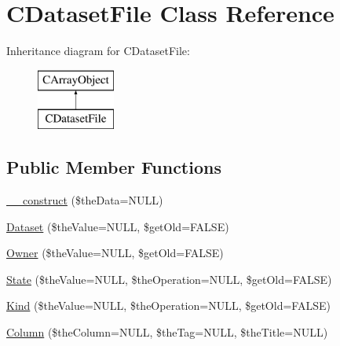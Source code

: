 \hypertarget{class_c_dataset_file}{\section{C\-Dataset\-File Class Reference}
\label{class_c_dataset_file}
}
Inheritance diagram for C\-Dataset\-File\-:\begin{figure}[H]
\begin{center}
\leavevmode
\includegraphics[height=2.000000cm]{class_c_dataset_file}
\end{center}
\end{figure}
\subsection*{Public Member Functions}
\begin{DoxyCompactItemize}
\item 
\hyperlink{class_c_dataset_file_a8e2d5b7660c65fef0f304a8f81c239fa}{\-\_\-\-\_\-construct} (\$the\-Data=N\-U\-L\-L)
\item 
\hyperlink{class_c_dataset_file_a2c26bae21eda50d110f8459cc2352bbf}{Dataset} (\$the\-Value=N\-U\-L\-L, \$get\-Old=F\-A\-L\-S\-E)
\item 
\hyperlink{class_c_dataset_file_ad3880b3fc69f61711de06ccfd01e407a}{Owner} (\$the\-Value=N\-U\-L\-L, \$get\-Old=F\-A\-L\-S\-E)
\item 
\hyperlink{class_c_dataset_file_a2c79dc1df451f7bd3da34965515deb16}{State} (\$the\-Value=N\-U\-L\-L, \$the\-Operation=N\-U\-L\-L, \$get\-Old=F\-A\-L\-S\-E)
\item 
\hyperlink{class_c_dataset_file_a73921a3c99d6a6bb823aabb689b84f1d}{Kind} (\$the\-Value=N\-U\-L\-L, \$the\-Operation=N\-U\-L\-L, \$get\-Old=F\-A\-L\-S\-E)
\item 
\hyperlink{class_c_dataset_file_a19bf22649c538e6d0c7c9e6e92769de9}{Column} (\$the\-Column=N\-U\-L\-L, \$the\-Tag=N\-U\-L\-L, \$the\-Title=N\-U\-L\-L)
\end{DoxyCompactItemize}


